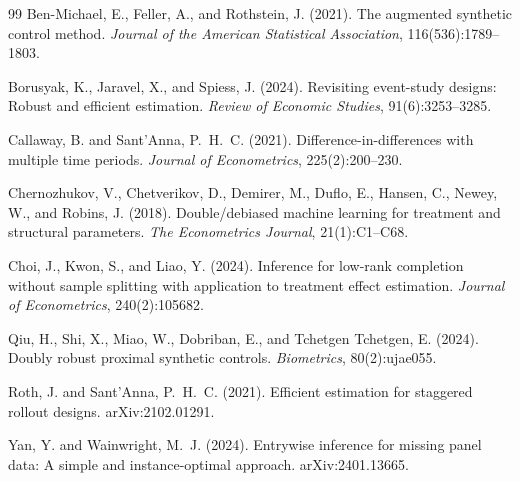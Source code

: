 \documentclass[11pt]{article}
\theoremstyle{definition}
\theoremstyle{plain}
\theoremstyle{remark}
\begin{document}
\begin{thebibliography}{99}
Ben-Michael, E., Feller, A., and Rothstein, J. (2021).
\newblock The augmented synthetic control method.
\newblock \emph{Journal of the American Statistical Association},
116(536):1789--1803.

Borusyak, K., Jaravel, X., and Spiess, J. (2024).
\newblock Revisiting event-study designs: Robust and efficient estimation.
\newblock \emph{Review of Economic Studies}, 91(6):3253--3285.

Callaway, B. and Sant'Anna, P.~H.~C. (2021).
\newblock Difference-in-differences with multiple time periods.
\newblock \emph{Journal of Econometrics}, 225(2):200--230.

Chernozhukov, V., Chetverikov, D., Demirer, M., Duflo, E., Hansen, C.,
Newey, W., and Robins, J. (2018).
\newblock Double/debiased machine learning for treatment and structural
parameters.
\newblock \emph{The Econometrics Journal}, 21(1):C1--C68.

Choi, J., Kwon, S., and Liao, Y. (2024).
\newblock Inference for low-rank completion without sample splitting with
application to treatment effect estimation.
\newblock \emph{Journal of Econometrics}, 240(2):105682.

Qiu, H., Shi, X., Miao, W., Dobriban, E., and Tchetgen Tchetgen, E. (2024).
\newblock Doubly robust proximal synthetic controls.
\newblock \emph{Biometrics}, 80(2):ujae055.

Roth, J. and Sant'Anna, P.~H.~C. (2021).
\newblock Efficient estimation for staggered rollout designs.
\newblock arXiv:2102.01291.

Yan, Y. and Wainwright, M.~J. (2024).
\newblock Entrywise inference for missing panel data: A simple and
instance-optimal approach.
\newblock arXiv:2401.13665.
\end{thebibliography}
\end{document}

